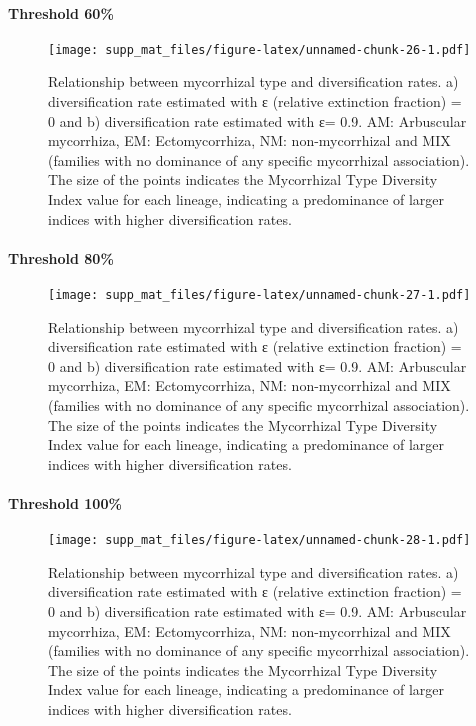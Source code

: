\documentclass[]{article}
\let\oldparagraph\paragraph
\renewcommand{\paragraph}[1]{\oldparagraph{#1}\mbox{}}
\begin{document}
\hypertarget{threshold-60-2}{%
\paragraph{Threshold 60\%}\label{threshold-60-2}}

\begin{figure}
\centering
\texttt{[image: supp\_mat\_files/figure-latex/unnamed-chunk-26-1.pdf]}
\caption{Relationship between mycorrhizal type and diversification
rates. a) diversification rate estimated with ε (relative extinction
fraction) = 0 and b) diversification rate estimated with ε= 0.9. AM:
Arbuscular mycorrhiza, EM: Ectomycorrhiza, NM: non-mycorrhizal and MIX
(families with no dominance of any specific mycorrhizal association).
The size of the points indicates the Mycorrhizal Type Diversity Index
value for each lineage, indicating a predominance of larger indices with
higher diversification rates.}
\end{figure}

\hypertarget{threshold-80-2}{%
\paragraph{Threshold 80\%}\label{threshold-80-2}}

\begin{figure}
\centering
\texttt{[image: supp\_mat\_files/figure-latex/unnamed-chunk-27-1.pdf]}
\caption{Relationship between mycorrhizal type and diversification
rates. a) diversification rate estimated with ε (relative extinction
fraction) = 0 and b) diversification rate estimated with ε= 0.9. AM:
Arbuscular mycorrhiza, EM: Ectomycorrhiza, NM: non-mycorrhizal and MIX
(families with no dominance of any specific mycorrhizal association).
The size of the points indicates the Mycorrhizal Type Diversity Index
value for each lineage, indicating a predominance of larger indices with
higher diversification rates.}
\end{figure}

\hypertarget{threshold-100-2}{%
\paragraph{Threshold 100\%}\label{threshold-100-2}}

\begin{figure}
\centering
\texttt{[image: supp\_mat\_files/figure-latex/unnamed-chunk-28-1.pdf]}
\caption{Relationship between mycorrhizal type and diversification
rates. a) diversification rate estimated with ε (relative extinction
fraction) = 0 and b) diversification rate estimated with ε= 0.9. AM:
Arbuscular mycorrhiza, EM: Ectomycorrhiza, NM: non-mycorrhizal and MIX
(families with no dominance of any specific mycorrhizal association).
The size of the points indicates the Mycorrhizal Type Diversity Index
value for each lineage, indicating a predominance of larger indices with
higher diversification rates.}
\end{figure}
\end{document}

